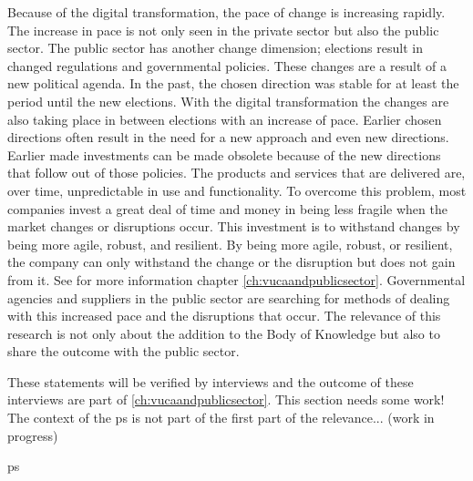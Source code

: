 Because of the digital transformation, the pace of change is increasing rapidly. The increase in pace is not only seen in the private sector but also the public sector. The public sector has another change dimension; elections result in changed regulations and governmental policies. These changes are a result of a new political agenda. In the past, the chosen direction was stable for at least the period until the new elections. With the digital transformation the changes are also taking place in between elections with an increase of pace. Earlier chosen directions often result in the need for a new approach and even new directions. Earlier made investments can be made obsolete because of the new directions that follow out of those policies. The products and services that are delivered are, over time, unpredictable in use and functionality. To overcome this problem, most companies invest a great deal of time and money in being less fragile when the market changes or disruptions occur. This investment is to withstand changes by being more agile, robust, and resilient. By being more agile, robust, or resilient, the company can only withstand the change or the disruption but does not gain from it. See for more information chapter \ref{ch:vucaandpublicsector}. Governmental agencies and suppliers in the public sector are searching for methods of dealing with this increased pace and the disruptions that occur. The relevance of this research is not only about the addition to the Body of Knowledge but also to share the outcome with the public sector.

\begin{remark}
	These statements will be verified by interviews and the outcome of these interviews are part of \ref{ch:vucaandpublicsector}.
	This section needs some work! The context of the \gls{ps} is not part of the first part of the relevance... (work in progress)
\end{remark}

\Gls{ps}